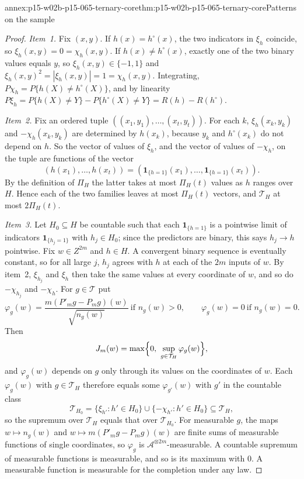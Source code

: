 \begin{annexitem}{annex:p15-w02b-p15-065-ternary-core}{thm:p15-w02b-p15-065-ternary-core}{Patterns on the sample}
\begin{proof}
\emph{Item~1.} Fix \((x,y)\). If \(h(x)=h^{\circ}(x)\), the two indicators
in \(\xi_h\) coincide, so \(\xi_h(x,y)=0=\chi_h(x,y)\). If
\(h(x)\ne h^{\circ}(x)\), exactly one of the two binary values equals
\(y\), so \(\xi_h(x,y)\in\{-1,1\}\) and
\(\xi_h(x,y)^2=|\xi_h(x,y)|=1=\chi_h(x,y)\). Integrating,
\(P\chi_h=P\{h(X)\ne h^{\circ}(X)\}\), and by linearity
\(P\xi_h=P\{h(X)\ne Y\}-P\{h^{\circ}(X)\ne Y\}=R(h)-R(h^{\circ})\).

\emph{Item~2.} Fix an ordered tuple \(((x_1,y_1),\ldots,(x_t,y_t))\). For
each \(k\), \(\xi_h(x_k,y_k)\) and \(-\chi_h(x_k,y_k)\) are determined by
\(h(x_k)\), because \(y_k\) and \(h^{\circ}(x_k)\) do not depend on \(h\).
So the vector of values of \(\xi_h\), and the vector of values of
\(-\chi_h\), on the tuple are functions of the vector
\[
 (h(x_1),\ldots,h(x_t))=(\mathbf1_{\{h=1\}}(x_1),\ldots,\mathbf1_{\{h=1\}}(x_t)).
\]
By the definition of \(\Pi_H\) the latter takes at most \(\Pi_H(t)\)
values as \(h\) ranges over \(H\). Hence each of the two families leaves
at most \(\Pi_H(t)\) vectors, and \(\mathcal T_H\) at most \(2\Pi_H(t)\).

\emph{Item~3.} Let \(H_0\subseteq H\) be countable such that each
\(\mathbf1_{\{h=1\}}\) is a pointwise limit of indicators
\(\mathbf1_{\{h_j=1\}}\) with \(h_j\in H_0\); since the predictors are
binary, this says \(h_j\to h\) pointwise. Fix \(w\in Z^{2m}\) and
\(h\in H\). A convergent binary sequence is eventually constant, so for
all large \(j\), \(h_j\) agrees with \(h\) at each of the \(2m\) inputs
of \(w\). By item~2, \(\xi_{h_j}\) and \(\xi_h\) then take the same values
at every coordinate of \(w\), and so do \(-\chi_{h_j}\) and \(-\chi_h\).
For \(g\in\mathcal T\) put
\[
 \varphi_g(w)=\frac{m(P'_mg-P_mg)(w)}{\sqrt{n_g(w)}}\ \text{if }n_g(w)>0,
 \qquad\varphi_g(w)=0\ \text{if }n_g(w)=0 .
\]
Then
\[
 J_m(w)=\max\Bigl\{0,\ \sup_{g\in\mathcal T_H}\varphi_g(w)\Bigr\},
\]
and \(\varphi_g(w)\) depends on \(g\) only through its values on the
coordinates of \(w\). Each \(\varphi_g(w)\) with \(g\in\mathcal T_H\)
therefore equals some \(\varphi_{g'}(w)\) with \(g'\) in the countable
class
\[
 \mathcal T_{H_0}=\{\xi_{h'}:h'\in H_0\}\cup\{-\chi_{h'}:h'\in H_0\}\subseteq\mathcal T_H,
\]
so the supremum over \(\mathcal T_H\) equals that over \(\mathcal T_{H_0}\).
For measurable \(g\), the maps \(w\mapsto n_g(w)\) and
\(w\mapsto m(P'_mg-P_mg)(w)\) are finite sums of measurable functions of
single coordinates, so \(\varphi_g\) is \(\mathcal A^{\otimes2m}\)-measurable.
A countable supremum of measurable functions is measurable, and so is its
maximum with \(0\). A measurable function is measurable for the
completion under any law.
\end{proof}
\end{annexitem}


